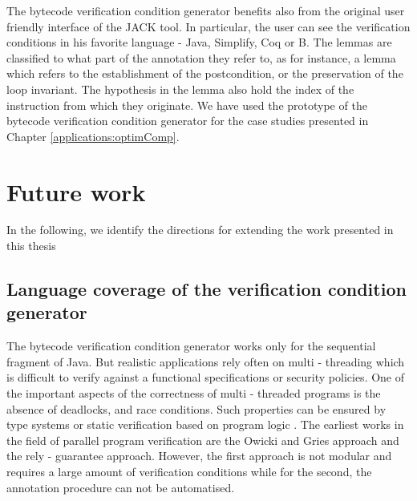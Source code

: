 The bytecode verification condition generator benefits also from the original user friendly interface of the JACK tool.  In particular, 
the user can see the verification conditions in his favorite language - Java, Simplify, Coq or B. The lemmas are classified 
to what part of the annotation they refer to, as for instance, a lemma which refers to the establishment of the postcondition, or the preservation of the loop invariant.
The hypothesis in the lemma also hold the index of the instruction from which they originate. 
We have used the prototype of the bytecode verification condition generator for the case studies presented in Chapter \ref{applications:optimComp}.


\section{Future work}
In the following, we identify the directions for extending the work presented in this thesis

\subsection{Language coverage of the verification condition generator}
The bytecode verification condition generator works only for the sequential fragment of Java. But realistic applications 
rely often on multi - threading which is difficult to verify against a functional specifications or security policies.
One of the important aspects of the correctness of multi - threaded programs is the absence of deadlocks, 
and race conditions. Such properties can be ensured  by type systems \cite{FA99TSL,flanagan00typebased} or static verification based on program logic \cite{FLL02ESC}.  
The earliest works in the field of parallel program  verification are
  the Owicki and Gries approach   
\cite{nipkow99owickigries}  and the rely - guarantee approach. However, 
the first approach is not modular and requires a large amount of verification conditions while for the second, the annotation procedure can not be automatised.


